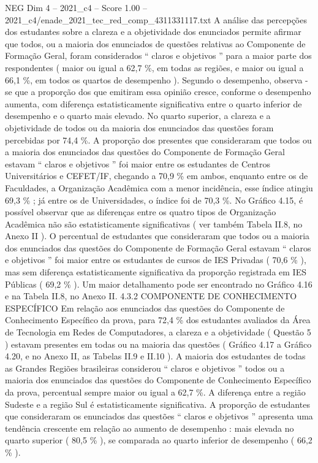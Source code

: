 \begin{textsample}{NEG Dim 4 – 2021\_c4 – Score 1.00 – 2021\_c4/enade\_2021\_tec\_red\_comp\_4311331117.txt}
A análise das percepções dos estudantes sobre a clareza e a objetividade dos enunciados permite afirmar que todos, ou a maioria dos enunciados de questões relativas ao Componente de Formação Geral, foram considerados “ claros e objetivos ” para a maior parte dos respondentes ( maior ou igual a 62,7 \%, em todas as regiões, e maior ou igual a 66,1 \%, em todos os quartos de desempenho ).
Segundo o desempenho, observa -se que a proporção dos que emitiram essa opinião cresce, conforme o desempenho aumenta, com diferença estatisticamente significativa entre o quarto inferior de desempenho e o quarto mais elevado.
No quarto superior, a clareza e a objetividade de todos ou da maioria dos enunciados das questões foram percebidas por 74,4 \%.
A proporção dos presentes que consideraram que todos ou a maioria dos enunciados das questões do Componente de Formação Geral estavam “ claros e objetivos ” foi maior entre os estudantes de Centros Universitários e CEFET/IF, chegando a 70,9 \% em ambos, enquanto entre os de Faculdades, a Organização Acadêmica com a menor incidência, esse índice atingiu 69,3 \% ; já entre os de Universidades, o índice foi de 70,3 \%.
No Gráfico 4.15, é possível observar que as diferenças entre os quatro tipos de Organização Acadêmica não são estatisticamente significativas ( ver também Tabela II.8, no Anexo II ).
O percentual de estudantes que consideraram que todos ou a maioria dos enunciados das questões do Componente de Formação Geral estavam “ claros e objetivos ” foi maior entre os estudantes de cursos de IES Privadas ( 70,6 \% ), mas sem diferença estatisticamente significativa da proporção registrada em IES Públicas ( 69,2 \% ).
Um maior detalhamento pode ser encontrado no Gráfico 4.16 e na Tabela II.8, no Anexo II. 4.3.2 COMPONENTE DE CONHECIMENTO ESPECÍFICO Em relação aos enunciados das questões do Componente de Conhecimento Específico da prova, para 72,4 \% dos estudantes avaliados da Área de Tecnologia em Redes de Computadores, a clareza e a objetividade ( Questão 5 ) estavam presentes em todas ou na maioria das questões ( Gráfico 4.17 a Gráfico 4.20, e no Anexo II, as Tabelas II.9 e II.10 ).
A maioria dos estudantes de todas as Grandes Regiões brasileiras considerou “ claros e objetivos ” todos ou a maioria dos enunciados das questões do Componente de Conhecimento Específico da prova, percentual sempre maior ou igual a 62,7 \%.
A diferença entre a região Sudeste e a região Sul é estatisticamente significativa.
A proporção de estudantes que consideraram os enunciados das questões “ claros e objetivos ” apresenta uma tendência crescente em relação ao aumento de desempenho : mais elevada no quarto superior ( 80,5 \% ), se comparada ao quarto inferior de desempenho ( 66,2 \% ).

\end{textsample}
